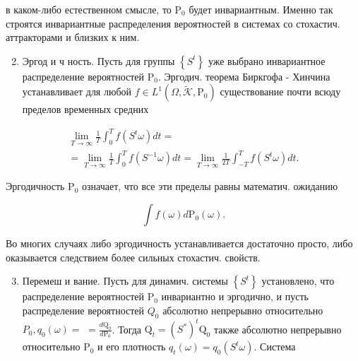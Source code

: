 \documentclass[10pt]{article}
\begin{document}
в каком-либо естественном смысле, то $\mathrm{P}_{0}$ будет инвариантным. Именно так строятся инвариантные распределения вероятностей в системах со стохастич. аттракторами и близких к ним.



\begin{enumerate}

  \setcounter{enumi}{1}

  \item Эргод и ч ность. Пусть для группы $\left\{S^{t}\right\}$ уже выбрано инвариантное распределение вероятностей $\mathrm{P}_{0}$. Эргодич. теорема Биркгофа - Хинчина устанавливает для любой $f \in L^{1}\left(\Omega, \widetilde{\mathcal{K}}, \mathrm{P}_{0}\right)$ существование почти всюду пределов временных средних

\end{enumerate}



\[

\begin{gathered}

\lim _{T \rightarrow \infty} \frac{1}{T} \int_{0}^{T} f\left(S^{t} \omega\right) d t= \\

=\lim _{T \rightarrow \infty} \frac{1}{T} \int_{0}^{T} f\left(S^{-1} \omega\right) d t=\lim _{T \rightarrow \infty} \frac{1}{2 T} \int_{-T}^{T} f\left(S^{t} \omega\right) d t .

\end{gathered}

\]



Эргодичность $\mathrm{P}_{0}$ означает, что все эти пределы равны математич. ожиданию



\[

\int f(\omega) d \mathrm{P}_{0}(\omega) .

\]



Во многих случаях либо эргодичность устанавливается достаточно просто, либо оказывается следствием более сильных стохастич. свойств.



\begin{enumerate}

  \setcounter{enumi}{2}

  \item Перемеш и вание. Пусть для динамич. системы $\left\{S^{t}\right\}$ установлено, что распределение вероятностей $\mathrm{P}_{0}$ инвариантно и эргодично, и пусть распределение вероятностей $Q_{0}$ абсолютно непрерывно относительно $P_{0}, q_{0}(\omega)=$ $=\frac{d \mathrm{Q}_{0}}{d \mathrm{P}_{0}}$. Тогда $\mathrm{Q}_{t}=\left(S^{*}\right)^{t} \mathrm{Q}_{0}$ также абсолютно непрерывно относительно $\mathrm{P}_{0}$ и его плотность $q_{t}(\omega)=q_{0}\left(S^{t} \omega\right)$. Система

\end{enumerate}
\end{document}
